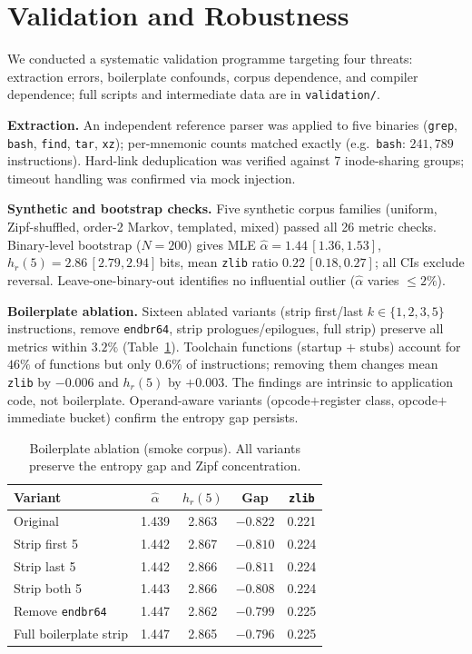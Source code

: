 \documentclass[conference]{IEEEtran}
\newcommand{\hr}[1]{h_r(#1)}
\newcommand{\zlib}{\texttt{zlib}}
\begin{document}
\section{Validation and Robustness}
\label{sec:validation}

We conducted a systematic validation programme targeting four threats:
extraction errors, boilerplate confounds, corpus dependence, and
compiler dependence; full scripts and intermediate data are in
\texttt{validation/}.

\textbf{Extraction.}
An independent reference parser was applied to five binaries
(\texttt{grep}, \texttt{bash}, \texttt{find}, \texttt{tar},
\texttt{xz}); per-mnemonic counts matched exactly
(e.g.\ \texttt{bash}: $241{,}789$ instructions).
Hard-link deduplication was verified against 7 inode-sharing groups;
timeout handling was confirmed via mock injection.

\textbf{Synthetic and bootstrap checks.}
Five synthetic corpus families (uniform, Zipf-shuffled, order-2 Markov,
templated, mixed) passed all 26 metric checks.  Binary-level bootstrap
($N{=}200$) gives MLE $\hat{\alpha}{=}1.44\,[1.36,1.53]$,
$\hr{5}{=}2.86\,[2.79,2.94]$\,bits, mean \zlib{} ratio
$0.22\,[0.18,0.27]$; all CIs exclude reversal.  Leave-one-binary-out
identifies no influential outlier ($\hat{\alpha}$ varies ${\leq}2\%$).

\textbf{Boilerplate ablation.}
Sixteen ablated variants (strip first/last $k{\in}\{1,2,3,5\}$ instructions,
remove \texttt{endbr64}, strip prologues/epilogues, full strip) preserve
all metrics within $3.2\%$ (Table~\ref{tab:ablation}).  Toolchain
functions (startup + stubs) account for $46\%$ of functions but only
$0.6\%$ of instructions; removing them changes mean \zlib{} by
$-0.006$ and $\hr{5}$ by $+0.003$.  The findings are intrinsic to
application code, not boilerplate.  Operand-aware variants
(opcode$+$register class, opcode$+$immediate bucket) confirm the
entropy gap persists.

\begin{table}[t]
\centering
\caption{Boilerplate ablation (smoke corpus).  All variants preserve
         the entropy gap and Zipf concentration.}
\label{tab:ablation}
\begin{tabular}{@{}lcccc@{}}
\toprule
\textbf{Variant} & $\hat{\alpha}$ & $\hr{5}$ & \textbf{Gap} & \zlib{} \\
\midrule
Original                  & 1.439 & 2.863 & $-0.822$ & 0.221 \\
Strip first 5             & 1.442 & 2.867 & $-0.810$ & 0.224 \\
Strip last 5              & 1.442 & 2.866 & $-0.811$ & 0.224 \\
Strip both 5              & 1.443 & 2.866 & $-0.808$ & 0.224 \\
Remove \texttt{endbr64}   & 1.447 & 2.862 & $-0.799$ & 0.225 \\
Full boilerplate strip    & 1.447 & 2.865 & $-0.796$ & 0.225 \\
\bottomrule
\end{tabular}
\end{table}
\end{document}

